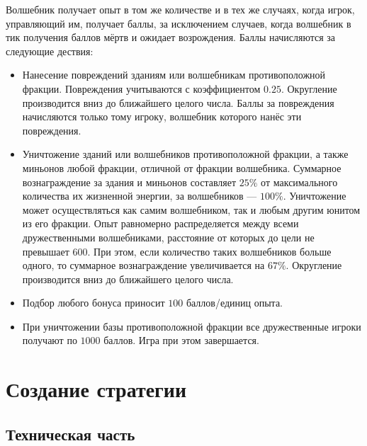 Волшебник получает опыт в том же количестве и в тех же случаях, когда игрок, управляющий им, получает баллы, за исключением случаев, когда
волшебник в тик получения баллов мёртв и ожидает возрождения. Баллы начисляются за следующие дествия:
\begin{itemize}
    \item Нанесение повреждений зданиям или волшебникам противоположной фракции. Повреждения учитываются с коэффициентом $0.25$. Округление
        производится вниз до ближайшего целого числа. Баллы за повреждения начисляются только тому игроку, волшебник которого нанёс эти
        повреждения.
    \item Уничтожение зданий или волшебников противоположной фракции, а также миньонов любой фракции, отличной от фракции волшебника.
        Суммарное вознаграждение за здания и миньонов составляет $25\%$ от максимального количества их жизненной энергии, за волшебников ---
        $100\%$. Уничтожение может осуществляться как самим волшебником, так и любым другим юнитом из его фракции. Опыт равномерно
        распределяется между всеми дружественными волшебниками, расстояние от которых до цели не превышает $600$. При этом, если количество
        таких волшебников больше одного, то суммарное вознаграждение увеличивается на $67\%$. Округление производится вниз до ближайшего
        целого числа.
    \item Подбор любого бонуса приносит $100$ баллов/единиц опыта.
    \item При уничтожении базы противоположной фракции все дружественные игроки получают по $1000$ баллов. Игра при этом завершается.
\end{itemize}

\chapter{Создание стратегии}

\section{Техническая часть}

